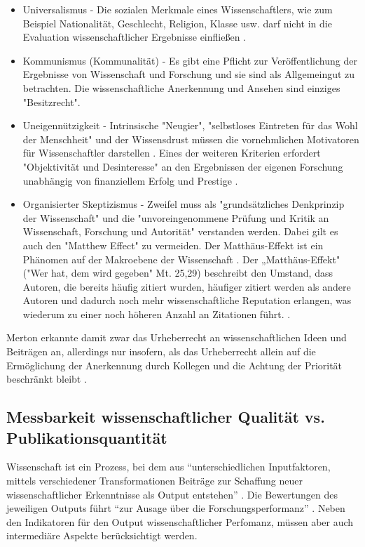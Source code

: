 \begin{itemize}
\item Universalismus - Die sozialen Merkmale eines Wissenschaftlers, wie zum Beispiel Nationalität, Geschlecht, Religion, Klasse usw. darf nicht in die Evaluation wissenschaftlicher Ergebnisse einfließen \cite{suchen}.
\item Kommunismus (Kommunalität) - Es gibt eine Pflicht zur Veröffentlichung der Ergebnisse von Wissenschaft und Forschung und sie sind als Allgemeingut zu betrachten. Die wissenschaftliche Anerkennung und Ansehen sind einziges "Besitzrecht"\cite{suchen}.
\item Uneigennützigkeit - Intrinsische "Neugier"\cite{suchen}, "selbstloses Eintreten für das Wohl der Menschheit"\cite{suchen} und der Wissensdrust müssen die vornehmlichen Motivatoren für Wissenschaftler darstellen \cite{suchen}. Eines der weiteren Kriterien erfordert "Objektivität und Desinteresse" an den Ergebnissen der eigenen Forschung \cite{suchen} unabhängig von finanziellem Erfolg und Prestige \cite{suchen}.
\item Organisierter Skeptizismus - Zweifel muss als "grundsätzliches Denkprinzip der Wissenschaft" \cite{suchen} und die "unvoreingenommene Prüfung und Kritik an Wissenschaft, Forschung und Autorität" \cite{suchen} verstanden werden. Dabei gilt es auch den "Matthew Effect" zu vermeiden. Der Matthäus-Effekt ist ein Phänomen auf der Makroebene der Wissenschaft \cite{bonitz_1998_matthaus}. Der „Matthäus-Effekt" ("Wer hat, dem wird gegeben" Mt. 25,29) beschreibt den Umstand, dass Autoren, die bereits häufig zitiert wurden, häufiger zitiert werden als andere Autoren und dadurch noch mehr wissenschaftliche Reputation erlangen, was wiederum zu einer noch höheren Anzahl an Zitationen führt. \cite{Merton_1968} \cite{meier_2009_matthaus}.
\end{itemize}

Merton erkannte damit zwar das Urheberrecht an wissenschaftlichen Ideen und Beiträgen an, allerdings nur insofern, als das Urheberrecht allein auf die Ermöglichung der Anerkennung durch Kollegen und die Achtung der Priorität beschränkt bleibt \cite{Fangerau_2014}.

\subsection{Messbarkeit wissenschaftlicher Qualität vs. Publikationsquantität}
Wissenschaft ist ein Prozess, bei dem aus “unterschiedlichen Inputfaktoren, mittels verschiedener Transformationen Beiträge zur Schaffung neuer wissenschaftlicher Erkenntnisse als Output entstehen” \cite{Jansen_2007}. Die Bewertungen des jeweiligen Outputs führt “zur Ausage über die Forschungsperformanz” \cite{suchen}. Neben den Indikatoren für den Output wissenschaftlicher Perfomanz, müssen aber auch intermediäre Aspekte berücksichtigt werden\cite{schmoch_2009}.

